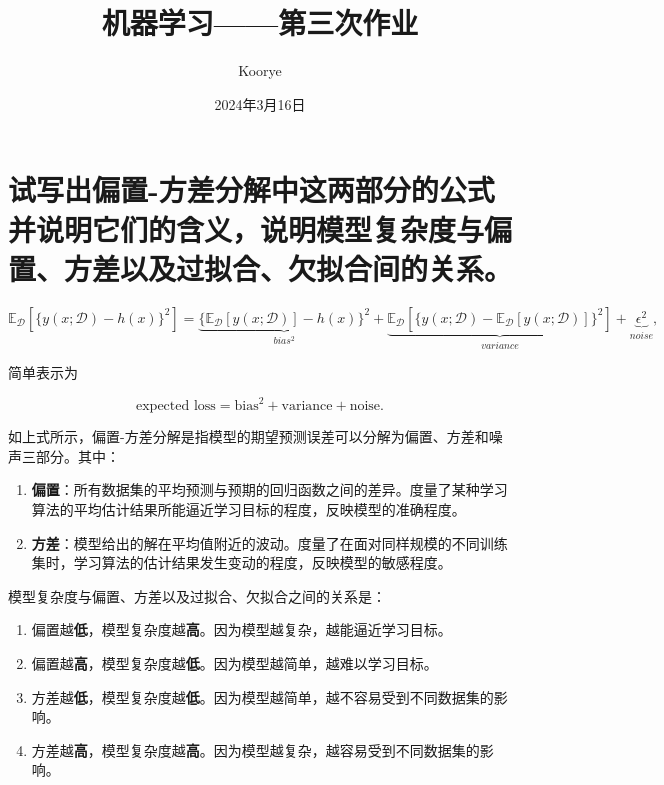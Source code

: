 \documentclass{article}
\title{机器学习——第三次作业}
\author{Koorye}
\date{2024年3月16日}
\begin{document}
\maketitle
\thispagestyle{fancy}

\section{试写出偏置-方差分解中这两部分的公式并说明它们的含义，说明模型复杂度与偏置、方差以及过拟合、欠拟合间的关系。}

\begin{equation}
    \mathbb{E}_\mathcal{D}[\{y(x;\mathcal{D})-h(x)\}^2]=\underbrace{\{\mathbb{E}_\mathcal{D}[y(x;\mathcal{D})]-h(x)\}^2}_{bias^2}+\underbrace{\mathbb{E}_\mathcal{D}[\{y(x;\mathcal{D})-\mathbb{E}_\mathcal{D}[y(x;\mathcal{D})]\}^2]}_{variance}+\underbrace{\epsilon^2}_{noise},
\end{equation}

简单表示为

\begin{equation}
    \text{expected loss} = \text{bias}^2 + \text{variance} + \text{noise}.
\end{equation}

如上式所示，偏置-方差分解是指模型的期望预测误差可以分解为偏置、方差和噪声三部分。其中：

\begin{enumerate}
    \item \textbf{偏置}：所有数据集的平均预测与预期的回归函数之间的差异。度量了某种学习算法的平均估计结果所能逼近学习目标的程度，反映模型的准确程度。
    \item \textbf{方差}：模型给出的解在平均值附近的波动。度量了在面对同样规模的不同训练集时，学习算法的估计结果发生变动的程度，反映模型的敏感程度。
\end{enumerate}

模型复杂度与偏置、方差以及过拟合、欠拟合之间的关系是：

\begin{enumerate}
    \item 偏置越\textbf{低}，模型复杂度越\textbf{高}。因为模型越复杂，越能逼近学习目标。
    \item 偏置越\textbf{高}，模型复杂度越\textbf{低}。因为模型越简单，越难以学习目标。
    \item 方差越\textbf{低}，模型复杂度越\textbf{低}。因为模型越简单，越不容易受到不同数据集的影响。
    \item 方差越\textbf{高}，模型复杂度越\textbf{高}。因为模型越复杂，越容易受到不同数据集的影响。
\end{enumerate}
\end{document}
